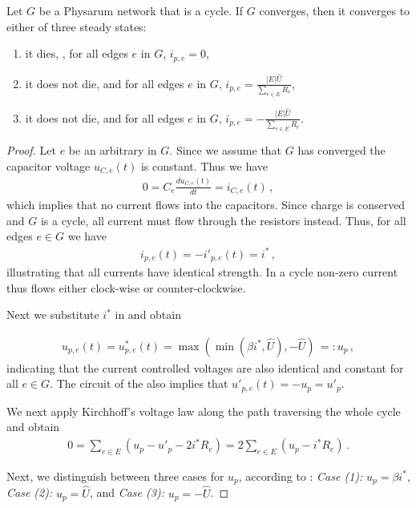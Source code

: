 \begin{lem}\label{lem:ring_cont}
Let $G$ be a Physarum network that is a cycle. If $G$ converges, then it converges to either of three steady states:
\begin{enumerate}
\item it dies, \ie, for all edges $e$ in $G$, $i_{p,e}=0$,\label{case:1}
\item it does not die, and for all edges $e$ in $G$, $i_{p,e}=\frac{|E|\hat{U}}{\sum_{e \in E} R_e}$,\label{case:2}
\item it does not die, and for all edges $e$ in $G$, $i_{p,e}=-\frac{|E|\hat{U}}{\sum_{e \in E} R_e}$.\label{case:3}
\end{enumerate}
\end{lem}
\begin{proof}
Let $e$ be an arbitrary \Pe in $G$. Since we assume that $G$ has converged the capacitor voltage $u_{C,e}(t)$ is constant. Thus we have
\begin{align}
0 = C_e\frac{du_{C,e}(t)}{dt} = i_{C,e}(t)\,,
\end{align}
which implies that no current flows into the capacitors. Since charge is conserved and $G$ is a cycle, all current must flow through the resistors instead. Thus, for all edges $e \in G$ we have
\begin{align}
  i_{p,e}(t) = - i'_{p,e}(t) = i^*\,,
\end{align}
illustrating that all currents have identical strength. In a cycle non-zero current thus flows either clock-wise or counter-clockwise. 

Next we substitute $i^*$ in  and obtain

\begin{align}
  u_{p,e}(t) = u^*_{p,e}(t) = \max(\min(\beta i^*,\hat{U}),-\hat{U})\, =: u_p\,,\label{eq:up}
\end{align}
indicating that the current controlled voltages are also identical and constant for all $e \in G$. The circuit of the \Pe also implies that $u'_{p,e}(t) = - u_p = u'_p$.

We next apply Kirchhoff's voltage law along the path traversing the whole cycle and obtain
\begin{align}
0 = \sum_{e \in E} (u_p - u'_p - 2 i^* R_e) = 2\sum_{e \in E} (u_p - i^* R_e)\,.\label{eq:sum1}
\end{align}

Next, we distinguish between three cases for $u_p$, according to : {\em Case (1):} $u_p = \beta i^*$, {\em Case (2):} $u_p = \hat{U}$, and {\em Case (3):} $u_p = -\hat{U}$.


\end{proof}
